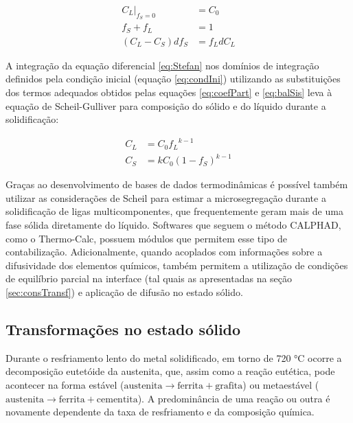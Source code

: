 \begin{subequations}[resume]
	\begin{align}
		\label{eq:condIni}\left.C_L\right|_{f_S=0} &= C_0\\
		\label{eq:balSis}f_S + f_L &= 1\\
		\label{eq:Stefan}\left(C_L - C_S\right) df_S &= f_L dC_L
	\end{align}
\end{subequations}

A integração da equação diferencial \ref{eq:Stefan} nos domínios de integração definidos pela condição inicial (equação \ref{eq:condIni}) utilizando as substituições dos termos adequados obtidos pelas equações \ref{eq:coefPart} e \ref{eq:balSis} leva à equação de Scheil-Gulliver para composição do sólido e do líquido durante a solidificação:

\begin{subequations}
	\begin{align}
		C_L &= C_0 {f_L}^{k-1}\\
		\label{eq:C_S}C_S &= k C_0\left(1 - f_S\right)^{k-1}
	\end{align}
\end{subequations}

Graças ao desenvolvimento de bases de dados termodinâmicas é possível também utilizar as considerações de Scheil para estimar a microsegregação durante a solidificação de ligas multicomponentes, que frequentemente geram mais de uma fase sólida diretamente do líquido. Softwares que seguem o método CALPHAD, como o Thermo-Calc\textregistered, possuem módulos que permitem esse tipo de contabilização. Adicionalmente, quando acoplados com informações sobre a difusividade dos elementos químicos, também permitem a utilização de condições de equilíbrio parcial na interface (tal quais as apresentadas na seção \ref{sec:consTransf}) e aplicação de difusão no estado sólido\cite{Chen2002,Larouche2007}.

\subsection{Transforma\c{c}\~{o}es no estado s\'{o}lido}

Durante o resfriamento lento do metal solidificado, em torno de 720 °C ocorre a decomposição eutetóide da austenita, que, assim como a reação eutética, pode acontecer na forma estável ($\text{austenita} \rightarrow \text{ferrita} + \text{grafita}$) ou metaestável ($\text{austenita} \rightarrow \text{ferrita} + \text{cementita}$). A predominância de uma reação ou outra é novamente dependente da taxa de resfriamento e da composição química.

